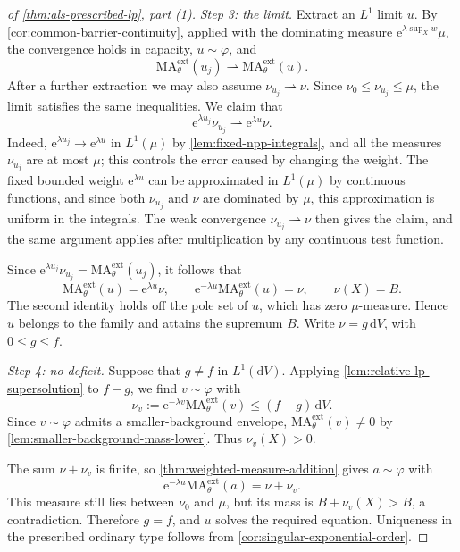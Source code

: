\begin{proof}[of \cref{thm:als-prescribed-lp}, part (1)]
\emph{Step 3: the limit.} Extract an $L^1$ limit $u$. By \cref{cor:common-barrier-continuity}, applied with the dominating measure $\mathrm{e}^{\lambda\sup_Xw}\mu$, the convergence holds in capacity, $u\sim\varphi$, and
\[
 \mathrm{MA}^{\mathrm{ext}}_\theta(u_j)
 \rightharpoonup\mathrm{MA}^{\mathrm{ext}}_\theta(u).
\]
After a further extraction we may also assume $\nu_{u_j}\rightharpoonup\nu$. Since $\nu_0\leq\nu_{u_j}\leq\mu$, the limit satisfies the same inequalities. We claim that
\[
 \mathrm{e}^{\lambda u_j}\nu_{u_j}\rightharpoonup \mathrm{e}^{\lambda u}\nu.
\]
Indeed, $\mathrm{e}^{\lambda u_j}\to \mathrm{e}^{\lambda u}$ in $L^1(\mu)$ by \cref{lem:fixed-npp-integrals}, and all the measures $\nu_{u_j}$ are at most $\mu$; this controls the error caused by changing the weight. The fixed bounded weight $\mathrm{e}^{\lambda u}$ can be approximated in $L^1(\mu)$ by continuous functions, and since both $\nu_{u_j}$ and $\nu$ are dominated by $\mu$, this approximation is uniform in the integrals. The weak convergence $\nu_{u_j}\rightharpoonup\nu$ then gives the claim, and the same argument applies after multiplication by any continuous test function.

Since $\mathrm{e}^{\lambda u_j}\nu_{u_j}=\mathrm{MA}^{\mathrm{ext}}_\theta(u_j)$, it follows that
\[
 \mathrm{MA}^{\mathrm{ext}}_\theta(u)=\mathrm{e}^{\lambda u}\nu,
 \qquad \mathrm{e}^{-\lambda u}\mathrm{MA}^{\mathrm{ext}}_\theta(u)=\nu,
 \qquad\nu(X)=B.
\]
The second identity holds off the pole set of $u$, which has zero $\mu$-measure. Hence $u$ belongs to the family and attains the supremum $B$. Write $\nu=g\,\mathrm{d}V$, with $0\leq g\leq f$.

\emph{Step 4: no deficit.} Suppose that $g\neq f$ in $L^1(\mathrm{d}V)$. Applying \cref{lem:relative-lp-supersolution} to $f-g$, we find $v\sim\varphi$ with
\[
 \nu_v:=\mathrm{e}^{-\lambda v}\mathrm{MA}^{\mathrm{ext}}_\theta(v)
 \leq(f-g)\,\mathrm{d}V.
\]
Since $v\sim\varphi$ admits a smaller-background envelope, $\mathrm{MA}^{\mathrm{ext}}_\theta(v)\neq0$ by \cref{lem:smaller-background-mass-lower}. Thus $\nu_v(X)>0$.

The sum $\nu+\nu_v$ is finite, so \cref{thm:weighted-measure-addition} gives $a\sim\varphi$ with
\[
 \mathrm{e}^{-\lambda a}\mathrm{MA}^{\mathrm{ext}}_\theta(a)=\nu+\nu_v.
\]
This measure still lies between $\nu_0$ and $\mu$, but its mass is $B+\nu_v(X)>B$, a contradiction. Therefore $g=f$, and $u$ solves the required equation. Uniqueness in the prescribed ordinary type follows from \cref{cor:singular-exponential-order}.
\end{proof}

